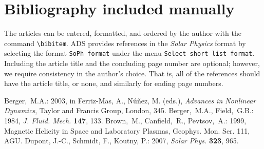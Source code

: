 \documentclass[namedreferences]{solarphysics}
\newcommand{\solphys}{{\it Solar Phys.}}
\begin{document}
\begin{article}

  

 {\typeout{}
\typeout{****************************************************}
\typeout{****************************************************}
  
\typeout{****************************************************}
\typeout{****************************************************}
\typeout{}}

\section*{Bibliography included manually }
  The articles can be entered, formatted, and ordered  
by the author with the command \verb+\bibitem+.  ADS provides
references in the {\it Solar Physics} format by selecting
the format \verb+SoPh format+ under the menu 
\verb+Select short list format+.    Including the article title
and the concluding page number are optional;
however, we require consistency in the author's choice.
That is, all of the references should have the article title, or none,
and similarly for ending page numbers.

\begin{thebibliography}{}
Berger,~M.A.: 
2003, in Ferriz-Mas, A., N{\'u}{\~n}ez, M. (eds.),
    \textit{Advances in Nonlinear Dynamics}, Taylor and Francis Group, 
    London, 345.
Berger,~M.A., Field,~G.B.: 
1984, \textit{J. Fluid. Mech.} \textbf{147}, 133.
Brown,~M., Canfield,~R., Pevtsov,~A.:
1999, Magnetic Helicity in Space and Laboratory Plasmas, Geophys. Mon. 
      Ser. 111, AGU.
Dupont, J.-C., Schmidt, F., Koutny, P.: 2007, \solphys{} \textbf{323}, 965. 
\end{thebibliography}

\end{article} 
\end{document}

